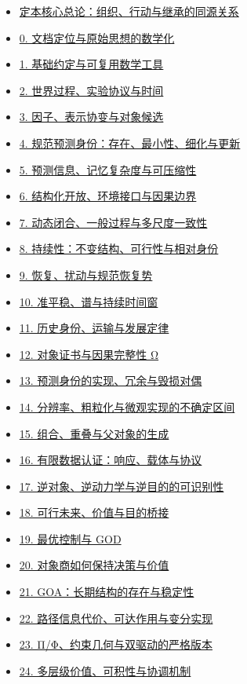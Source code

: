 \documentclass[
  11pt,
  oneside]{book}
\begin{document}
\begin{itemize}
\item
  \hyperref[core-theory]{定本核心总论：组织、行动与继承的同源关系}
\item
  \hyperref[ch-0]{0. 文档定位与原始思想的数学化}
\item
  \hyperref[ch-1]{1. 基础约定与可复用数学工具}
\item
  \hyperref[ch-2]{2. 世界过程、实验协议与时间}
\item
  \hyperref[ch-3]{3. 因子、表示协变与对象候选}
\item
  \hyperref[ch-4]{4. 规范预测身份：存在、最小性、细化与更新}
\item
  \hyperref[ch-5]{5. 预测信息、记忆复杂度与可压缩性}
\item
  \hyperref[ch-6]{6. 结构化开放、环境接口与因果边界}
\item
  \hyperref[ch-7]{7. 动态闭合、一般过程与多尺度一致性}
\item
  \hyperref[ch-8]{8. 持续性：不变结构、可行性与相对身份}
\item
  \hyperref[ch-9]{9. 恢复、扰动与规范恢复势}
\item
  \hyperref[ch-10]{10. 准平稳、谱与持续时间窗}
\item
  \hyperref[ch-11]{11. 历史身份、运输与发展定律}
\item
  \hyperref[ch-12]{12. 对象证书与因果完整性 Ω}
\item
  \hyperref[ch-13]{13. 预测身份的实现、冗余与毁损对偶}
\item
  \hyperref[ch-14]{14. 分辨率、粗粒化与微观实现的不确定区间}
\item
  \hyperref[ch-15]{15. 组合、重叠与父对象的生成}
\item
  \hyperref[ch-16]{16. 有限数据认证：响应、载体与协议}
\item
  \hyperref[ch-17]{17. 逆对象、逆动力学与逆目的的可识别性}
\item
  \hyperref[ch-18]{18. 可行未来、价值与目的桥接}
\item
  \hyperref[ch-19]{19. 最优控制与 GOD}
\item
  \hyperref[ch-20]{20. 对象商如何保持决策与价值}
\item
  \hyperref[ch-21]{21. GOA：长期结构的存在与稳定性}
\item
  \hyperref[ch-22]{22. 路径信息代价、可达作用与变分实现}
\item
  \hyperref[ch-23]{23. Π/Φ、约束几何与双驱动的严格版本}
\item
  \hyperref[ch-24]{24. 多层级价值、可积性与协调机制}

\end{itemize}
\end{document}
